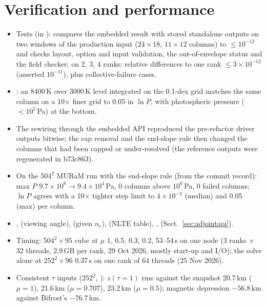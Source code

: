 \section{Verification and performance}\label{sec:ver}
\begin{itemize}
\item Tests (in ):  compares the embedded result with stored standalone outputs
on two windows of the production input ($24\times18$, $11\times12$ columns) to $\le10^{-12}$ and checks layout, option and
input validation, the out-of-envelope status and the field checker;  on 2, 3, 4 ranks: relative
differences to one rank $\le3\times10^{-12}$ (asserted $10^{-11}$), plus collective-failure cases.
\item {}: an 8400\,K over 3000\,K level integrated on the 0.1-dex grid matches the same column on a
10$\times$ finer grid to 0.05 in $\ln P$, with photospheric pressure ($<10^5$\,Pa) at the bottom.
\item The rewiring through the embedded API reproduced the pre-refactor driver outputs bitwise; the cap removal and the
end-slope rule then changed the columns that had been capped or under-resolved (the reference outputs were regenerated
in b73c863).
\item On the $504^2$ MURaM run with the end-slope rule (from the commit record): max $P$ $9.7\times10^8\to9.4\times10^4$\,Pa,
0 columns above $10^6$\,Pa, 0 failed columns; $\ln P$ agrees with a 10$\times$ tighter step limit to $4\times10^{-3}$ (median)
and 0.05 (max) per column.
\item {},  (viewing angle),  (given $n_e$), 
(NLTE table), ,  (Sect.~\ref{sec:adjointapi}).
\item Timing: $504^2\times95$ cube at $\mu$ 1, 0.5, 0.3, 0.2, 53--54\,s on one node (3 ranks $\times$ 32 threads, 2.9\,GB per rank,
29 Oct 2026, mostly start-up and I/O); the solve alone at $252^2\times96$ 0.37\,s on one rank of 64 threads (25 Nov 2026).
\item Consistent $\tau$ inputs ($252^2$, ): $z(\tau{=}1)$ rms against the snapshot
20.7\,km ($\mu=1$), 21.6\,km ($\mu=0.707$), 23.2\,km ($\mu=0.5$); magnetic depression $-56.8$\,km against Bifrost's $-76.7$\,km.
\end{itemize}

